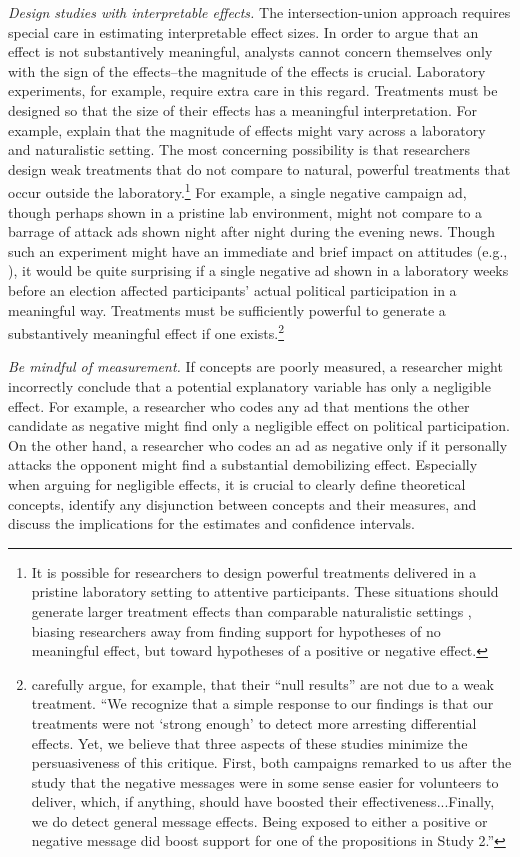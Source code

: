 \documentclass[12pt]{article}
\begin{document}
\textit{Design studies with interpretable effects.} The intersection-union approach requires special care in estimating interpretable effect sizes. In order to argue that an effect is not substantively meaningful, analysts cannot concern themselves only with the sign of the effects--the magnitude of the effects is crucial. Laboratory experiments, for example, require extra care in this regard. Treatments must be designed so that the size of their effects has a meaningful interpretation. For example, \citet[see also \citealt{Gerber2011}]{JeritBarabasClifford2013} explain that the magnitude of effects might vary across a laboratory and naturalistic setting. The most concerning possibility is that researchers design weak treatments that do not compare to natural, powerful treatments that occur outside the laboratory.\footnote{It is possible for researchers to design powerful treatments delivered in a pristine laboratory setting to attentive participants. These situations should generate larger treatment effects than comparable naturalistic settings \citep{Kinder2007}, biasing researchers away from finding support for hypotheses of no meaningful effect, but toward hypotheses of a positive or negative effect.} For example, a single negative campaign ad, though perhaps shown in a pristine lab environment, might not compare to a barrage of attack ads shown night after night during the evening news. Though such an experiment might have an immediate and brief impact on attitudes (e.g., \citealt{Ansolabehereetal1994}), it would be quite surprising if a single negative ad shown in a laboratory weeks before an election affected participants' actual political participation in a meaningful way. Treatments must be sufficiently powerful to generate a substantively meaningful effect if one exists.\footnote{\cite{ArceneauxNickerson2010} carefully argue, for example, that their ``null results'' are not due to a weak treatment. ``We recognize that a simple response to our findings is that our treatments were not `strong enough' to detect more arresting differential effects. Yet, we believe that three aspects of these studies minimize the persuasiveness of this critique. First, both campaigns remarked to us after the study that the negative messages were in some sense easier for volunteers to deliver, which, if anything, should have boosted their effectiveness...Finally, we do detect general message effects. Being exposed to either a positive or negative message did boost support for one of the propositions in Study 2.''}

\textit{Be mindful of measurement.} If concepts are poorly measured, a researcher might incorrectly conclude that a potential explanatory variable has only a negligible effect. For example, a researcher who codes any ad that mentions the other candidate as negative might find only a negligible effect on political participation. On the other hand, a researcher who codes an ad as negative only if it personally attacks the opponent might find a substantial demobilizing effect. Especially when arguing for negligible effects, it is crucial to clearly define theoretical concepts, identify any disjunction between concepts and their measures, and discuss the implications for the estimates and confidence intervals.
\end{document}
